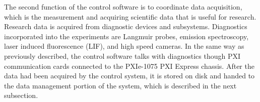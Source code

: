 
The second function of the control software is to coordinate data acquisition, which is the measurement and acquiring scientific data that is useful for research. Research data is acquired from diagnostic devices and subsystems. Diagnostics incorporated into the experiments are Langmuir probes, emission spectroscopy, laser induced fluorescence (LIF), and high speed cameras. In the same way as previously described, the control software talks with diagnostics though PXI communication cards connected to the PXIe-1075 PXI Express chassis. After the data had been acquired by the control system, it is stored on disk and handed to the data management portion of the system, which is described in the next subsection.






